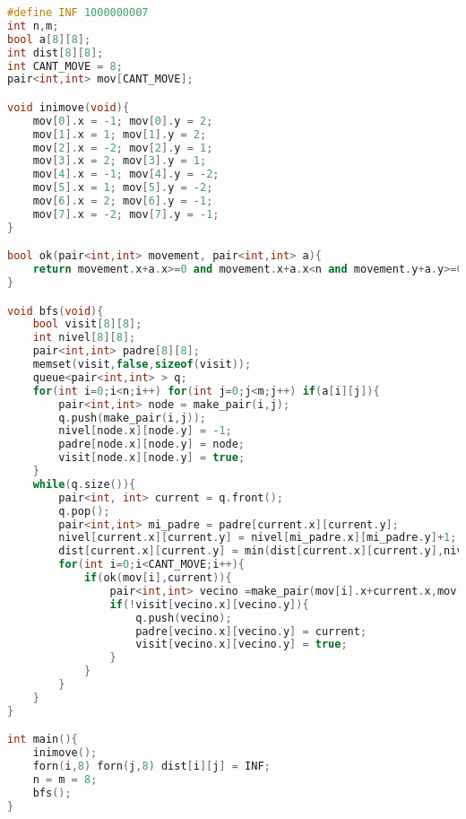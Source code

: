 \begin{lstlisting}[language=C++]
#define INF 1000000007
int n,m;
bool a[8][8];
int dist[8][8];
int CANT_MOVE = 8;
pair<int,int> mov[CANT_MOVE];

void inimove(void){
    mov[0].x = -1; mov[0].y = 2;
    mov[1].x = 1; mov[1].y = 2;
    mov[2].x = -2; mov[2].y = 1;
    mov[3].x = 2; mov[3].y = 1;
    mov[4].x = -1; mov[4].y = -2;
    mov[5].x = 1; mov[5].y = -2;
    mov[6].x = 2; mov[6].y = -1;
    mov[7].x = -2; mov[7].y = -1;
}

bool ok(pair<int,int> movement, pair<int,int> a){
    return movement.x+a.x>=0 and movement.x+a.x<n and movement.y+a.y>=0 and movement.y+a.y<m;  
}

void bfs(void){
    bool visit[8][8];
    int nivel[8][8];
    pair<int,int> padre[8][8];
    memset(visit,false,sizeof(visit));
    queue<pair<int,int> > q;
    for(int i=0;i<n;i++) for(int j=0;j<m;j++) if(a[i][j]){
        pair<int,int> node = make_pair(i,j);
        q.push(make_pair(i,j));
        nivel[node.x][node.y] = -1;
        padre[node.x][node.y] = node;
        visit[node.x][node.y] = true;
    }
    while(q.size()){
        pair<int, int> current = q.front();
        q.pop();
        pair<int,int> mi_padre = padre[current.x][current.y];
        nivel[current.x][current.y] = nivel[mi_padre.x][mi_padre.y]+1;
        dist[current.x][current.y] = min(dist[current.x][current.y],nivel[current.x][current.y]);
        for(int i=0;i<CANT_MOVE;i++){
            if(ok(mov[i],current)){
                pair<int,int> vecino =make_pair(mov[i].x+current.x,mov[i].y+current.y);
                if(!visit[vecino.x][vecino.y]){
                    q.push(vecino);
                    padre[vecino.x][vecino.y] = current;
                    visit[vecino.x][vecino.y] = true;
                }
            }
        }  
    }
}

int main(){
    inimove();
    forn(i,8) forn(j,8) dist[i][j] = INF;
    n = m = 8;
    bfs();
}
\end{lstlisting}